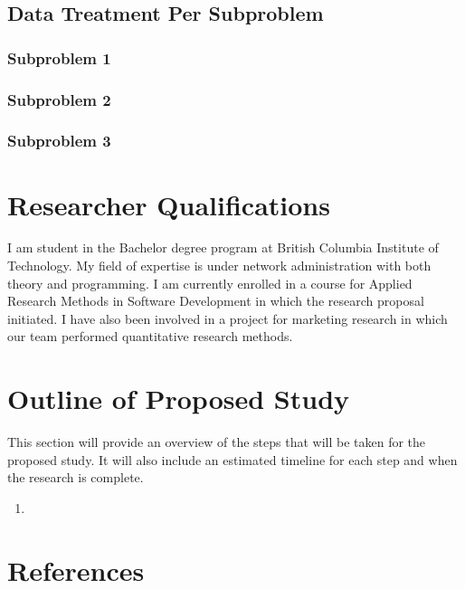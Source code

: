 \documentclass[titlepage]{article}
\begin{document}
\subsection{Data Treatment Per Subproblem}

\subsubsection{Subproblem 1}

\subsubsection{Subproblem 2}

\subsubsection{Subproblem 3}

\clearpage

\section{Researcher Qualifications}
I am student in the Bachelor degree program at British Columbia Institute of Technology.
My field of expertise is under network administration with both theory and programming.
I am currently enrolled in a course for Applied Research Methods in Software Development
in which the research proposal initiated.  I have also been involved in a project for
marketing research in which our team performed quantitative research methods.

\clearpage

\section{Outline of Proposed Study}
This section will provide an overview of the steps that will be taken for the proposed study.
It will also include an estimated timeline for each step and when the research is complete.\\

\begin{enumerate}
	\item 
\end{enumerate}

\clearpage

\section{References}
\end{document}
